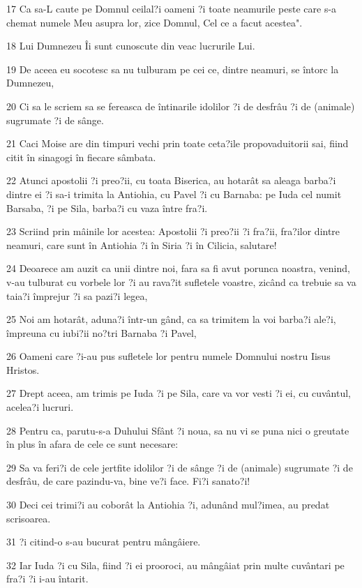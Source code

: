 \par 17 Ca sa-L caute pe Domnul ceilal?i oameni ?i toate neamurile peste care s-a chemat numele Meu asupra lor, zice Domnul, Cel ce a facut acestea".
\par 18 Lui Dumnezeu Îi sunt cunoscute din veac lucrurile Lui.
\par 19 De aceea eu socotesc sa nu tulburam pe cei ce, dintre neamuri, se întorc la Dumnezeu,
\par 20 Ci sa le scriem sa se fereasca de întinarile idolilor ?i de desfrâu ?i de (animale) sugrumate ?i de sânge.
\par 21 Caci Moise are din timpuri vechi prin toate ceta?ile propovaduitorii sai, fiind citit în sinagogi în fiecare sâmbata.
\par 22 Atunci apostolii ?i preo?ii, cu toata Biserica, au hotarât sa aleaga barba?i dintre ei ?i sa-i trimita la Antiohia, cu Pavel ?i cu Barnaba: pe Iuda cel numit Barsaba, ?i pe Sila, barba?i cu vaza între fra?i.
\par 23 Scriind prin mâinile lor acestea: Apostolii ?i preo?ii ?i fra?ii, fra?ilor dintre neamuri, care sunt în Antiohia ?i în Siria ?i în Cilicia, salutare!
\par 24 Deoarece am auzit ca unii dintre noi, fara sa fi avut porunca noastra, venind, v-au tulburat cu vorbele lor ?i au rava?it sufletele voastre, zicând ca trebuie sa va taia?i împrejur ?i sa pazi?i legea,
\par 25 Noi am hotarât, aduna?i într-un gând, ca sa trimitem la voi barba?i ale?i, împreuna cu iubi?ii no?tri Barnaba ?i Pavel,
\par 26 Oameni care ?i-au pus sufletele lor pentru numele Domnului nostru Iisus Hristos.
\par 27 Drept aceea, am trimis pe Iuda ?i pe Sila, care va vor vesti ?i ei, cu cuvântul, acelea?i lucruri.
\par 28 Pentru ca, parutu-s-a Duhului Sfânt ?i noua, sa nu vi se puna nici o greutate în plus în afara de cele ce sunt necesare:
\par 29 Sa va feri?i de cele jertfite idolilor ?i de sânge ?i de (animale) sugrumate ?i de desfrâu, de care pazindu-va, bine ve?i face. Fi?i sanato?i!
\par 30 Deci cei trimi?i au coborât la Antiohia ?i, adunând mul?imea, au predat scrisoarea.
\par 31 ?i citind-o s-au bucurat pentru mângâiere.
\par 32 Iar Iuda ?i cu Sila, fiind ?i ei prooroci, au mângâiat prin multe cuvântari pe fra?i ?i i-au întarit.
